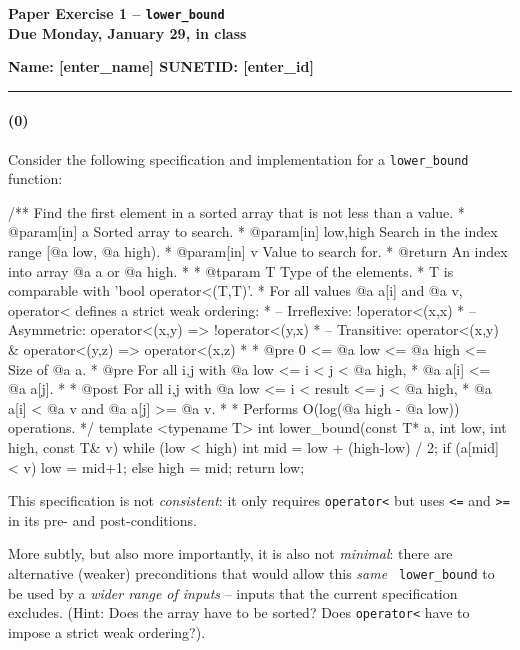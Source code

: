 \documentclass[12pt,letterpaper,twoside]{article}
\begin{document}
{\centering \textbf{Paper Exercise 1 -- {\tt lower\_bound}\\ Due Monday, January 29, in class} \par}
{\centering \textbf{Name: [enter\_name] SUNETID: [enter\_id]} \par}
\vspace*{-8pt}\noindent\rule{\linewidth}{1pt}
\vspace{-3em}

\paragraph{(0)} Consider the following specification and implementation for a {\tt lower\_bound} function:
\begin{cpp}
/** Find the first element in a sorted array that is not less than a value.
 * @param[in] a         Sorted array to search.
 * @param[in] low,high  Search in the index range [@a low, @a high).
 * @param[in] v         Value to search for.
 * @return  An index into array @a a or @a high.
 *
 * @tparam T Type of the elements. 
 *   T is comparable with 'bool operator<(T,T)'.
 *   For all values @a a[i] and @a v, operator< defines a strict weak ordering:
 *    -- Irreflexive: !operator<(x,x)
 *    -- Asymmetric:   operator<(x,y) => !operator<(y,x)
 *    -- Transitive:   operator<(x,y) & operator<(y,z) => operator<(x,z)
 *
 * @pre  0 <= @a low <= @a high <= Size of @a a.
 * @pre  For all i,j with @a low <= i < j < @a high, 
 *         @a a[i] <= @a a[j].
 *
 * @post For all i,j with @a low <= i < result <= j < @a high, 
 *         @a a[i] < @a v and @a a[j] >= @a v.
 *
 * Performs O(log(@a high - @a low)) operations.
 */
template <typename T>
int lower_bound(const T* a, int low, int high, const T& v) {
   while (low < high) {
      int mid = low + (high-low) / 2;
      if (a[mid] < v)
         low = mid+1;
      else
         high = mid; 
   }
   return low;
}
\end{cpp}
This specification is not {\em consistent}: it only requires {\tt operator<} but
uses {\tt <=} and {\tt >=} in its pre- and post-conditions.

More subtly, but also more importantly, it is also not {\em minimal}: there are
alternative (weaker) preconditions that would allow this {\em same} {\tt
  lower\_bound} to be used by a {\em wider range of inputs} -- inputs that the
current specification excludes. (Hint: Does the array have to be sorted? Does
\texttt{operator<} have to impose a strict weak ordering?).
\end{document}
